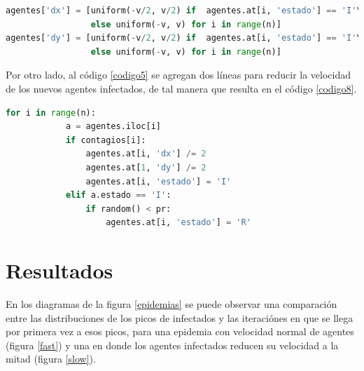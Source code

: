 \documentclass{article}
\begin{document}
\begin{lstlisting}[caption=Modificaci\'on del C\'odigo 3, label=codigo7, language=Python]
agentes['dx'] = [uniform(-v/2, v/2) if  agentes.at[i, 'estado'] == 'I'\
                 else uniform(-v, v) for i in range(n)]
agentes['dy'] = [uniform(-v/2, v/2) if  agentes.at[i, 'estado'] == 'I'\
                 else uniform(-v, v) for i in range(n)]
\end{lstlisting}

Por otro lado, al c\'odigo \ref{codigo5} se agregan dos l\'ineas para reducir la velocidad de los nuevos agentes infectados, de tal manera que resulta en el c\'odigo \ref{codigo8}.

\begin{lstlisting}[caption=Modificaci\'on del C\'odigo 5, label=codigo8, language=Python]
        for i in range(n):
            a = agentes.iloc[i]
            if contagios[i]:
                agentes.at[i, 'dx'] /= 2
                agentes.at[1, 'dy'] /= 2
                agentes.at[i, 'estado'] = 'I'
            elif a.estado == 'I':
                if random() < pr:
                    agentes.at[i, 'estado'] = 'R'
\end{lstlisting}

\section{Resultados}

En los diagramas de la figura \ref{epidemias} se puede observar una comparaci\'on entre las distribuciones de los picos de infectados y las iteraci\'ones en que se llega por primera vez a esos picos, para una epidemia con velocidad normal de agentes (figura \ref{fast}) y una en donde los agentes infectados reducen su velocidad a la mitad (figura \ref{slow}).
\end{document}
